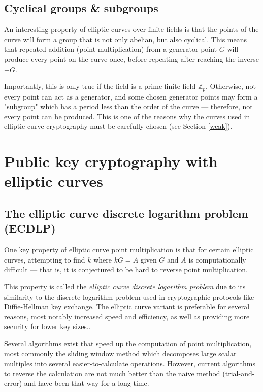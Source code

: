 \documentclass[a4paper]{article}
\begin{document}
\subsection{Cyclical groups \& subgroups}

An interesting property of elliptic curves over finite fields is that the points of the curve will form a group that is not only abelian, but also cyclical. This means that repeated addition (point multiplication) from a generator point $G$ will produce every point on the curve once, before repeating after reaching the inverse $-G$.

Importantly, this is only true if the field is a prime finite field $\mathbb{Z}_p$. Otherwise, not every point can act as a generator, and some chosen generator points may form a "subgroup" which has a period less than the order of the curve --- therefore, not every point can be produced.\cite{practical} This is one of the reasons why the curves used in elliptic curve cryptography must be carefully chosen (see Section \ref{weak}).


\section{Public key cryptography with elliptic curves}

\subsection{The elliptic curve discrete logarithm problem (ECDLP)}\label{ecdlp}

One key property of elliptic curve point multiplication is that for certain elliptic curves, attempting to find $k$ where $kG = A$ given $G$ and $A$ is computationally difficult --- that is, it is conjectured to be hard to reverse point multiplication.\cite{practical}

This property is called the \textit{elliptic curve discrete logarithm problem} due to its similarity to the discrete logarithm problem used in cryptographic protocols like Diffie-Hellman key exchange.\cite{discrete} The elliptic curve variant is preferable for several reasons, most notably increased speed and efficiency,\cite{nist2} as well as providing more security for lower key sizes.\cite{nist}.

Several algorithms exist that speed up the computation of point multiplication, most commonly the sliding window method which decomposes large scalar multiples into several easier-to-calculate operations. However, current algorithms to reverse the calculation are not much better than the naive method (trial-and-error)\cite{guide} and have been that way for a long time. 
\end{document}
